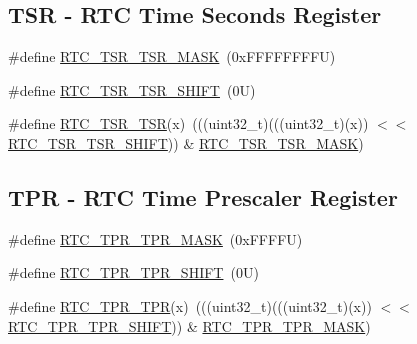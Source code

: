 \subsection*{T\+SR -\/ R\+TC Time Seconds Register}
\begin{DoxyCompactItemize}
\item 
\#define \mbox{\hyperlink{group___r_t_c___register___masks_ga9a0f8842e8262ca176fcf028982153af}{R\+T\+C\+\_\+\+T\+S\+R\+\_\+\+T\+S\+R\+\_\+\+M\+A\+SK}}~(0x\+F\+F\+F\+F\+F\+F\+F\+F\+U)
\item 
\#define \mbox{\hyperlink{group___r_t_c___register___masks_gad0476d1e39a866b5b5ba4728b55e258a}{R\+T\+C\+\_\+\+T\+S\+R\+\_\+\+T\+S\+R\+\_\+\+S\+H\+I\+FT}}~(0\+U)
\item 
\#define \mbox{\hyperlink{group___r_t_c___register___masks_ga0265b25e77883b6b0cb056ab697b5bc6}{R\+T\+C\+\_\+\+T\+S\+R\+\_\+\+T\+SR}}(x)~(((uint32\+\_\+t)(((uint32\+\_\+t)(x)) $<$$<$ \mbox{\hyperlink{group___r_t_c___register___masks_gad0476d1e39a866b5b5ba4728b55e258a}{R\+T\+C\+\_\+\+T\+S\+R\+\_\+\+T\+S\+R\+\_\+\+S\+H\+I\+FT}})) \& \mbox{\hyperlink{group___r_t_c___register___masks_ga9a0f8842e8262ca176fcf028982153af}{R\+T\+C\+\_\+\+T\+S\+R\+\_\+\+T\+S\+R\+\_\+\+M\+A\+SK}})
\end{DoxyCompactItemize}
\subsection*{T\+PR -\/ R\+TC Time Prescaler Register}
\begin{DoxyCompactItemize}
\item 
\#define \mbox{\hyperlink{group___r_t_c___register___masks_ga2682f687fa561be2f002fc574d48cc79}{R\+T\+C\+\_\+\+T\+P\+R\+\_\+\+T\+P\+R\+\_\+\+M\+A\+SK}}~(0x\+F\+F\+F\+F\+U)
\item 
\#define \mbox{\hyperlink{group___r_t_c___register___masks_ga624a290f73478b3ca2687ac49cc78fb2}{R\+T\+C\+\_\+\+T\+P\+R\+\_\+\+T\+P\+R\+\_\+\+S\+H\+I\+FT}}~(0\+U)
\item 
\#define \mbox{\hyperlink{group___r_t_c___register___masks_gac2c160abce9b85ad4d9386f0dd8c31ea}{R\+T\+C\+\_\+\+T\+P\+R\+\_\+\+T\+PR}}(x)~(((uint32\+\_\+t)(((uint32\+\_\+t)(x)) $<$$<$ \mbox{\hyperlink{group___r_t_c___register___masks_ga624a290f73478b3ca2687ac49cc78fb2}{R\+T\+C\+\_\+\+T\+P\+R\+\_\+\+T\+P\+R\+\_\+\+S\+H\+I\+FT}})) \& \mbox{\hyperlink{group___r_t_c___register___masks_ga2682f687fa561be2f002fc574d48cc79}{R\+T\+C\+\_\+\+T\+P\+R\+\_\+\+T\+P\+R\+\_\+\+M\+A\+SK}})
\end{DoxyCompactItemize}
